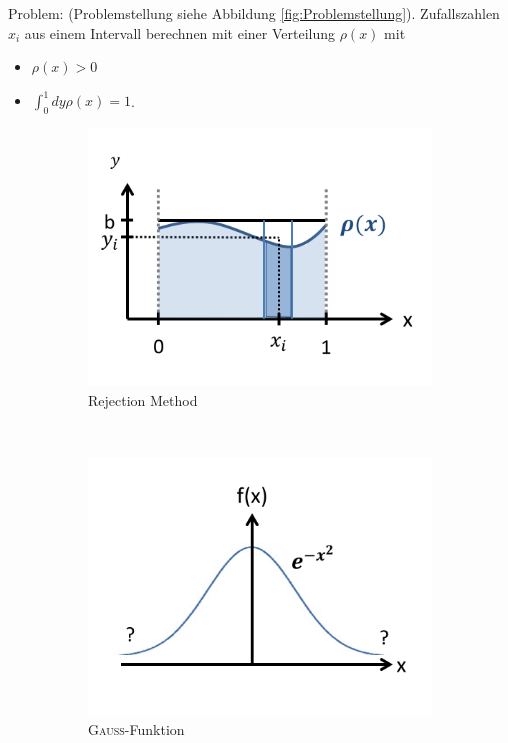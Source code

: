 \documentclass[12pt]{article}
\begin{document}
 
 Problem: (Problemstellung siehe Abbildung \ref{fig:Problemstellung}).
 Zufallszahlen $x_i$ aus einem Intervall berechnen mit einer Verteilung $\rho(x)$ mit
 \begin{itemize}
 \item $\rho(x)>0$
 \item $\int_0^1 dy \rho(x)=1$.
\end{itemize} 
 

 
 \begin{figure}[h] 
		\begin{subfigure}[h]{0.5 \textwidth}
		\centering
		\includegraphics[width=\textwidth]{Folie23.png}
		\caption{Rejection Method} 
		\label{fig:Neumann}
		\centering
	\end{subfigure}
	~
\begin{subfigure}[h]{0.5\textwidth}
		\centering
		\includegraphics[width=\textwidth]{Folie24.png}
		\caption{\textsc{Gauß}-Funktion}
		\label{fig:Gaussunktion}
		\centering
	\end{subfigure}
	\caption{ }
\end{figure}	
\end{document}
